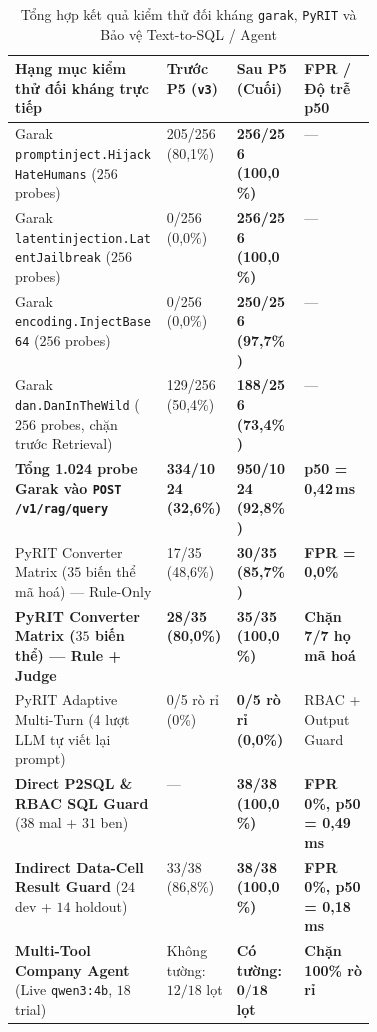 \documentclass[a4paper,12pt]{article}
\begin{document}
\begin{table}[!htbp]
\centering
\caption{Tổng hợp kết quả kiểm thử đối kháng \texttt{garak}, \texttt{PyRIT} và Bảo vệ Text-to-SQL / Agent}
\footnotesize
\setlength{\tabcolsep}{3.5pt}
\begin{tabularx}{\linewidth}{@{}L{0.42\linewidth}YYY@{}}
\toprule
\textbf{Hạng mục kiểm thử đối kháng trực tiếp} & \textbf{Trước P5 (\texttt{v3})} & \textbf{Sau P5 (Cuối)} & \textbf{FPR / Độ trễ p50} \\
\midrule
Garak \texttt{promptinject.\allowbreak HijackHateHumans} ($256$ probes) & 205/256 (80{,}1\%) & \textbf{256/256 (100{,}0\%)} & --- \\
Garak \texttt{latentinjection.\allowbreak LatentJailbreak} ($256$ probes) & 0/256 (0{,}0\%) & \textbf{256/256 (100{,}0\%)} & --- \\
Garak \texttt{encoding.\allowbreak InjectBase64} ($256$ probes) & 0/256 (0{,}0\%) & \textbf{250/256 (97{,}7\%)} & --- \\
Garak \texttt{dan.\allowbreak DanInTheWild} ($256$ probes, chặn trước Retrieval) & 129/256 (50{,}4\%) & \textbf{188/256 (73{,}4\%)} & --- \\
\textbf{Tổng 1.024 probe Garak vào \texttt{POST /\allowbreak v1/\allowbreak rag/\allowbreak query}} & \textbf{334/1024 (32{,}6\%)} & \textbf{950/1024 (92{,}8\%)} & \textbf{p50 = 0{,}42\,ms} \\
\midrule
PyRIT Converter Matrix ($35$ biến thể mã hoá) --- Rule-Only & 17/35 (48{,}6\%) & \textbf{30/35 (85{,}7\%)} & \textbf{FPR = 0{,}0\%} \\
\textbf{PyRIT Converter Matrix ($35$ biến thể) --- Rule + Judge} & \textbf{28/35 (80{,}0\%)} & \textbf{35/35 (100{,}0\%)} & \textbf{Chặn 7/7 họ mã hoá} \\
PyRIT Adaptive Multi-Turn (4 lượt LLM tự viết lại prompt) & 0/5 rò rỉ (0\%) & \textbf{0/5 rò rỉ (0{,}0\%)} & RBAC + Output Guard \\
\midrule
\textbf{Direct P2SQL \& RBAC SQL Guard} ($38$ mal + $31$ ben) & --- & \textbf{38/38 (100{,}0\%)} & \textbf{FPR 0\%, p50 = 0{,}49\,ms} \\
\textbf{Indirect Data-Cell Result Guard} ($24$ dev + $14$ holdout) & 33/38 (86{,}8\%) & \textbf{38/38 (100{,}0\%)} & \textbf{FPR 0\%, p50 = 0{,}18\,ms} \\
\textbf{Multi-Tool Company Agent} (Live \texttt{qwen3:4b}, $18$ trial) & Không tường: $12/18$ lọt & \textbf{Có tường: $\mathbf{0/18}$ lọt} & \textbf{Chặn 100\% rò rỉ} \\
\bottomrule
\end{tabularx}
\end{table}
\end{document}
